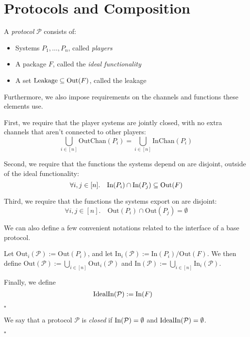 \section{Protocols and Composition}

\begin{definition}[Protocols]
A \emph{protocol} $\mathcal{P}$ consists of:
\begin{itemize}
\item Systems $P_1, \ldots, P_n$, called \emph{players}
\item A package $F$, called the \emph{ideal functionality}
\item A set $\text{Leakage} \subseteq \text{Out}(F)$, called the leakage
\end{itemize}

Furthermore, we also impose requirements on the channels and functions
these elements use.

First, we require that the player systems are jointly closed,
with no extra channels that aren't connected to other players:
$$
\bigcup_{i \in [n]} \text{OutChan}(P_i) = \bigcup_{i \in [n]} \text{InChan}(P_i)
$$

Second, we require that the functions the systems depend on are disjoint,
outside of the ideal functionality:
$$
\forall i, j \in [n].\quad \text{In}(P_i) \cap \text{In}(P_j) \subseteq \text{Out}(F)
$$

Third, we require that the functions the systems export on are disjoint:
$$
\forall i, j \in [n].\quad \text{Out}(P_i) \cap \text{Out}(P_j) = \emptyset
$$

We can also define a few convenient notations related to the interface of a base
protocol.

Let $\text{Out}_i(\mathcal{P}) := \text{Out}(P_i)$, and let $\text{In}_i(\mathcal{P}) := \text{In}(P_i) / \text{Out}(F)$.
We then define $\text{Out}(\mathcal{P}) := \bigcup_{i \in [n]} \text{Out}_i(\mathcal{P})$
and $\text{In}(\mathcal{P}) := \bigcup_{i \in [n]} \text{In}_i(\mathcal{P})$.

Finally, we define
$$
\begin{aligned}
&\text{IdealIn}(\mathcal{P}) := \text{In}(F)\cr
\end{aligned}
$$

$\square$
\end{definition}

\begin{definition}
  We say that a protocol $\mathcal{P}$ is \emph{closed} if
  $\text{In}(\mathcal{P}) = \emptyset$ and $\text{IdealIn}(\mathcal{P}) = \emptyset$.

  $\square$
\end{definition}

